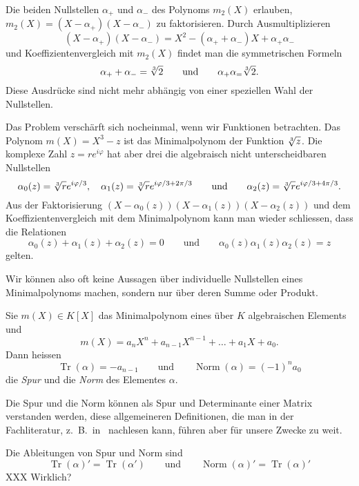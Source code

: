 Die beiden Nullstellen $\alpha_+$ und $\alpha_-$ des Polynoms $m_2(X)$
erlauben, $m_2(X)=(X-\alpha_+)(X-\alpha_-)$ zu faktorisieren.
Durch Ausmultiplizieren
\[
(X-\alpha_+)(X-\alpha_-)
=
X^2 -(\alpha_++\alpha_-)X+\alpha_+\alpha_-
\]
und Koeffizientenvergleich mit $m_2(X)$ findet man die symmetrischen 
Formeln
\[
\alpha_+ + \alpha_- = \root{3}\of{2}
\qquad\text{und}\qquad
\alpha_+ \alpha_ = \root{3}\of{2}.
\]
Diese Ausdrücke sind nicht mehr abhängig von einer speziellen Wahl
der Nullstellen.

Das Problem verschärft sich nocheinmal, wenn wir Funktionen betrachten.
Das Polynom $m(X)=X^3-z$ ist das Minimalpolynom der Funktion $\root{3}\of{z}$.
Die komplexe Zahl $z=re^{i\varphi}$ hat aber drei die algebraisch nicht
unterscheidbaren Nullstellen 
\[
\alpha_0(z)=\root{3}\of{r}e^{i\varphi/3},
\quad
\alpha_1(z)=\root{3}\of{r}e^{i\varphi/3+2\pi/3}
\qquad\text{und}\qquad
\alpha_2(z)=\root{3}\of{r}e^{i\varphi/3+4\pi/3}.
\]
Aus der Faktorisierung $ (X-\alpha_0(z)) (X-\alpha_1(z)) (X-\alpha_2(z))$
und dem Koeffizientenvergleich mit dem Minimalpolynom kann man wieder
schliessen, dass die Relationen
\[
\alpha_0(z) + \alpha_1(z) + \alpha_2(z)=0
\qquad\text{und}\qquad
\alpha_0(z)  \alpha_1(z) \alpha_2(z) = z
\]
gelten.

Wir können also oft keine Aussagen über individuelle Nullstellen
eines Minimalpolynoms machen, sondern nur über deren Summe oder
Produkt.

\begin{definition}
Sie $m(X)\in K[X]$ das Minimalpolynom eines über $K$ algebraischen
Elements und
\[
m(X) = a_nX^n + a_{n-1}X^{n-1} + \ldots + a_1X + a_0.
\]
Dann heissen
\[
\operatorname{Tr}(\alpha) = -a_{n-1}
\qquad\text{und}\qquad
\operatorname{Norm}(\alpha) = (-1)^n a_0
\]
die {\em Spur} und die {\em Norm} des Elementes $\alpha$.
%
%
\end{definition}

Die Spur und die Norm können als Spur und Determinante einer Matrix
verstanden werden, diese allgemeineren Definitionen, die man in der
Fachliteratur, z.~B.~in~\cite{buch:lang} nachlesen kann, führen aber
für unsere Zwecke zu weit.

\begin{hilfssatz}
Die Ableitungen von Spur und Norm sind
\[
\operatorname{Tr}(\alpha)'
=
\operatorname{Tr}(\alpha')
\qquad\text{und}\qquad
\operatorname{Norm}(\alpha)'
=
\operatorname{Tr}(\alpha)'
\]
XXX Wirklich?
\end{hilfssatz}

